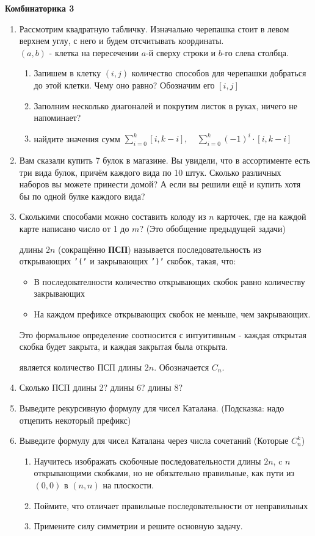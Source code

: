 \centerline{\bf Комбинаторика 3}
\begin{enumerate}
\item Рассмотрим квадратную табличку. Изначально черепашка стоит в левом верхнем углу, с него и
будем отсчитывать координаты.
\\ $(a, b)$ - клетка на пересечении $a$-й сверху строки и $b$-го слева
столбца.
\begin{enumerate}
\item Запишем в клетку $(i, j)$ количество способов для черепашки добраться до этой клетки. Чему оно
равно? Обозначим его $[i, j]$
\item Заполним несколько диагоналей и покрутим листок в руках, ничего не напоминает?
\item найдите значения сумм $ \sum_{i = 0}^k [i, k - i],\quad \sum_{i = 0}^k (-1)^i \cdot [i, k - i]$
\end{enumerate}
\item Вам сказали купить 7 булок в магазине. Вы увидели, что в
ассортименте есть три вида булок, причём каждого вида по 10 штук. Сколько различных наборов вы можете
принести домой? А если вы решили ещё и купить хотя бы по одной булке каждого вида?
\item Сколькими способами можно составить колоду из $n$ карточек, где на каждой карте написано число от
1 до $m$? (Это обобщение предыдущей задачи)

 длины $2n$ (сокращённо {\bf ПСП})
называется последовательность из открывающих {\tt'('} и закрывающих {\tt ')'} скобок, такая, что:
\begin{itemize}
\item В последователности количество открывающих скобок равно количеству закрывающих
\item На каждом префиксе открывающих скобок не меньше, чем закрывающих.
\end{itemize}
Это формальное определение соотносится с интуитивным - каждая открытая скобка будет закрыта, и
каждая закрытая была открыта.

 является количество ПСП длины $2n$. Обозначается
$C_n$.
\item Сколько ПСП длины 2? длины 6? длины 8?
\item Выведите рекурсивную формулу для чисел Каталана. {\small (Подсказка: надо отцепить некоторый
префикс)}
\item Выведите формулу для чисел Каталана через числа сочетаний (Которые $C_n^k$)
\begin{enumerate}
\item Научитесь изображать скобочные последовательности длины $2n$, c $n$ открывающими скобками, но
не обязательно правильные, как пути из $(0, 0)$ в $(n, n)$ на плоскости.
\item Поймите, что отличает правильные последовательности от неправильных
\item Примените силу симметрии и решите основную задачу.
\end{enumerate}
\end{enumerate}
